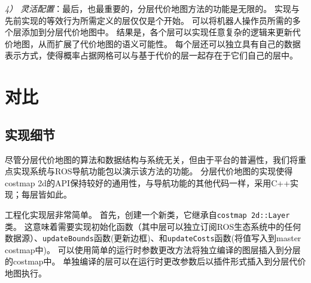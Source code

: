 \emph{\color{blue}4） 灵活配置}：最后，也最重要的，分层代价地图方法的功能是无限的。 实现与先前实现的等效行为所需定义的层仅仅是个开始。 
可以将机器人操作员所需的多个层添加到分层代价地图中。 结果是，各个层可以实现任意复杂的逻辑来更新代价地图，从而扩展了代价地图的语义可能性。 每个层还可以独立具有自己的数据表示方式，使得概率占据网格可以与基于代价的层一起存在于它们自己的层中。

\section{对比}

\subsection{实现细节}
尽管分层代价地图的算法和数据结构与系统无关，但由于平台的普遍性，我们将重点实现系统与ROS导航功能包以演示该方法的功能。 分层代价地图的实现使得costmap 2d的API保持较好的通用性，与导航功能的其他代码一样，采用C++实现；每层皆如此。

工程化实现层非常简单。 首先，创建一个新类，它继承自\texttt{costmap 2d::Layer}类。 这意味着需要实现初始化函数（其中层可以独立订阅ROS生态系统中的任何数据源）、\texttt{updateBounds}函数(更新边框)、和\texttt{updateCosts}函数(将值写入到master costmap中)。 
可以使用简单的运行时参数更改方法将独立编译的图层插入到分层的costmap中。
单独编译的层可以在运行时更改参数后以插件形式插入到分层代价地图执行。

